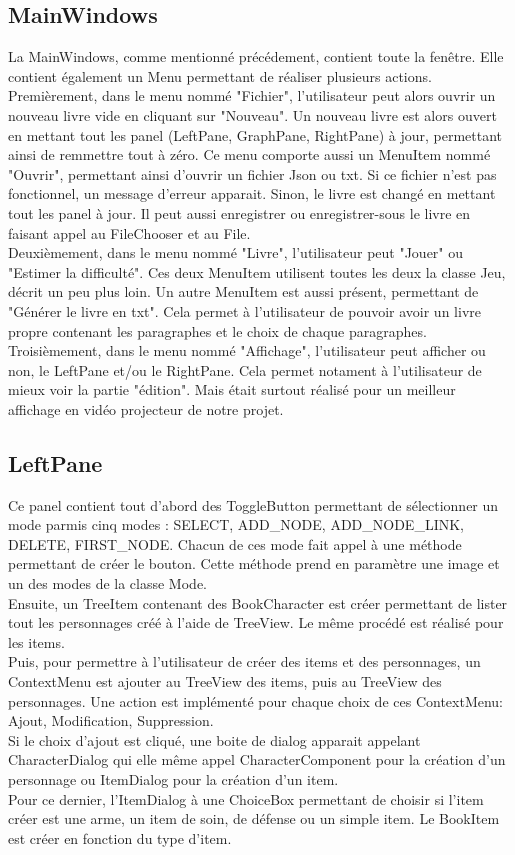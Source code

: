 		\subsection{MainWindows}
			La MainWindows, comme mentionné précédement, contient toute la fenêtre. Elle contient également un Menu permettant de réaliser plusieurs actions.\\
			Premièrement, dans le menu nommé "Fichier", l'utilisateur peut alors ouvrir un nouveau livre vide en cliquant sur "Nouveau". Un nouveau livre est alors ouvert en mettant tout les panel (LeftPane, GraphPane, RightPane) à jour, permettant ainsi de remmettre tout à zéro. Ce menu comporte aussi un MenuItem nommé "Ouvrir", permettant ainsi d'ouvrir un fichier Json ou txt. Si ce fichier n'est pas fonctionnel, un message d'erreur apparait. Sinon, le livre est changé en mettant tout les panel à jour. Il peut aussi enregistrer ou enregistrer-sous le livre en faisant appel au FileChooser et au File.\\
			Deuxièmement, dans le menu nommé "Livre", l'utilisateur peut "Jouer" ou "Estimer la difficulté". Ces deux MenuItem utilisent toutes les deux la classe Jeu, décrit un peu plus loin. Un autre MenuItem est aussi présent, permettant de "Générer le livre en txt". Cela permet à l'utilisateur de pouvoir avoir un livre propre contenant les paragraphes et le choix de chaque paragraphes.\\
			Troisièmement, dans le menu nommé "Affichage", l'utilisateur peut afficher ou non, le LeftPane et/ou le RightPane. Cela permet notament à l'utilisateur de mieux voir la partie "édition". Mais était surtout réalisé pour un meilleur affichage en vidéo projecteur de notre projet.\\

		\subsection{LeftPane}
			Ce panel contient tout d'abord des ToggleButton permettant de sélectionner un mode parmis cinq modes : SELECT, ADD_NODE, ADD_NODE_LINK, DELETE, FIRST_NODE. Chacun de ces mode fait appel à une méthode permettant de créer le bouton. Cette méthode prend en paramètre une image et un des modes de la classe Mode.\\
			Ensuite, un TreeItem contenant des BookCharacter est créer permettant de lister tout les personnages créé à l'aide de TreeView. Le même procédé est réalisé pour les items.\\
			Puis, pour permettre à l'utilisateur de créer des items et des personnages, un ContextMenu est ajouter au TreeView des items, puis au TreeView des personnages. Une action est implémenté pour chaque choix de ces ContextMenu: Ajout, Modification, Suppression.\\
			Si le choix d'ajout est cliqué, une boite de dialog apparait appelant CharacterDialog qui elle même appel CharacterComponent pour la création d'un personnage ou ItemDialog pour la création d'un item.\\
			Pour ce dernier, l'ItemDialog à une ChoiceBox permettant de choisir si l'item créer est une arme, un item de soin, de défense ou un simple item. Le BookItem est créer en fonction du type d'item.\\


